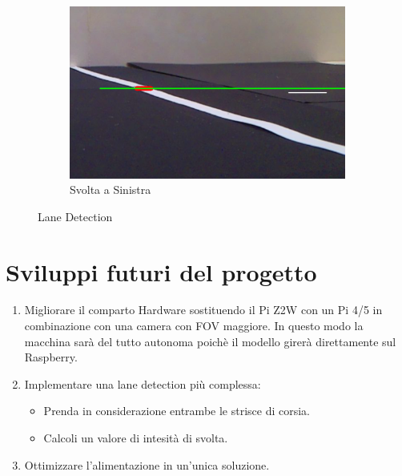 \documentclass{article}
\begin{document}
\begin{figure}[h!]
    \begin{subfigure}[b]{0.7\linewidth}
        \centering
        \includegraphics[width=\linewidth]{img/sinistra.png}
        \caption{Svolta a Sinistra}
        \label{fig:sinistra}
    \end{subfigure}

    \caption{Lane Detection}
    \label{fig:posizioni}
\end{figure}

\newpage

\section{Sviluppi futuri del progetto}
\begin{enumerate}
\item Migliorare il comparto Hardware sostituendo il Pi Z2W con un Pi 4/5 in combinazione con una camera con FOV maggiore. In questo modo la macchina sarà del tutto autonoma poichè il modello girerà direttamente sul Raspberry.
\item Implementare una lane detection più complessa:
    \begin{itemize}
    \item Prenda in considerazione entrambe le strisce di corsia.
    \item Calcoli un valore di intesità di svolta.
    \end{itemize}
\item Ottimizzare l'alimentazione in un'unica soluzione.
\end{enumerate}

\newpage

\medskip


\printbibliography
\end{document}

